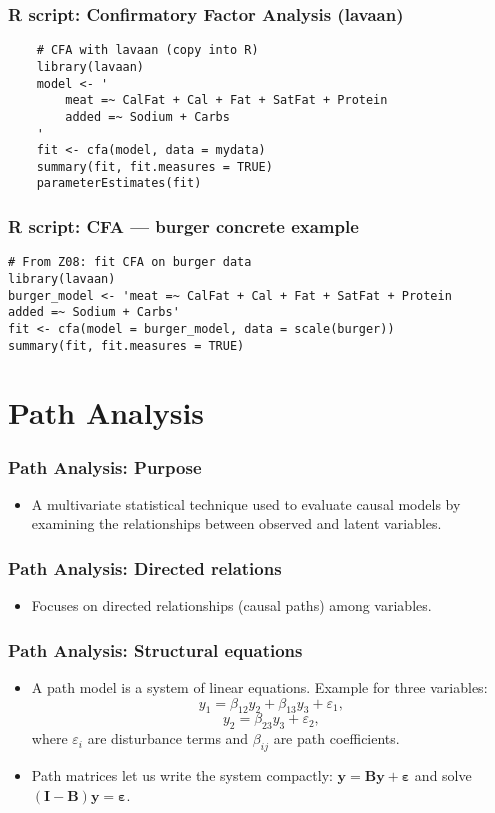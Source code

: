 \documentclass{beamer}
\begin{document}
    \begin{frame}[fragile]
            \frametitle{R script: Confirmatory Factor Analysis (lavaan)}
            \begin{verbatim}
    # CFA with lavaan (copy into R)
    library(lavaan)
    model <- '
        meat =~ CalFat + Cal + Fat + SatFat + Protein
        added =~ Sodium + Carbs
    '
    fit <- cfa(model, data = mydata)
    summary(fit, fit.measures = TRUE)
    parameterEstimates(fit)
            \end{verbatim}
    \end{frame}

\begin{frame}[fragile]
    \frametitle{R script: CFA — burger concrete example}
    \begin{verbatim}
# From Z08: fit CFA on burger data
library(lavaan)
burger_model <- 'meat =~ CalFat + Cal + Fat + SatFat + Protein
added =~ Sodium + Carbs'
fit <- cfa(model = burger_model, data = scale(burger))
summary(fit, fit.measures = TRUE)
    \end{verbatim}
\end{frame}

\section{Path Analysis}

\begin{frame}
    \frametitle{Path Analysis: Purpose}
    \begin{itemize}
        \item A multivariate statistical technique used to evaluate \alert{causal models} by examining the relationships between observed and latent variables.
    \end{itemize}
\end{frame}

\begin{frame}
    \frametitle{Path Analysis: Directed relations}
    \begin{itemize}
        \item Focuses on directed relationships (causal paths) among variables.
    \end{itemize}
\end{frame}

\begin{frame}
    \frametitle{Path Analysis: Structural equations}
    \begin{itemize}
        \item A path model is a system of linear equations. Example for three variables:
        \[y_1=\beta_{12}y_2+\beta_{13}y_3+\varepsilon_1,\]
        \[y_2=\beta_{23}y_3+\varepsilon_2,\]
        where $\varepsilon_i$ are disturbance terms and $\beta_{ij}$ are path coefficients.
        \item Path matrices let us write the system compactly: $\mathbf{y}=\mathbf{B}\mathbf{y}+\boldsymbol{\varepsilon}$ and solve $(\mathbf{I}-\mathbf{B})\mathbf{y}=\boldsymbol{\varepsilon}$.
    \end{itemize}
\end{frame}
\end{document}
